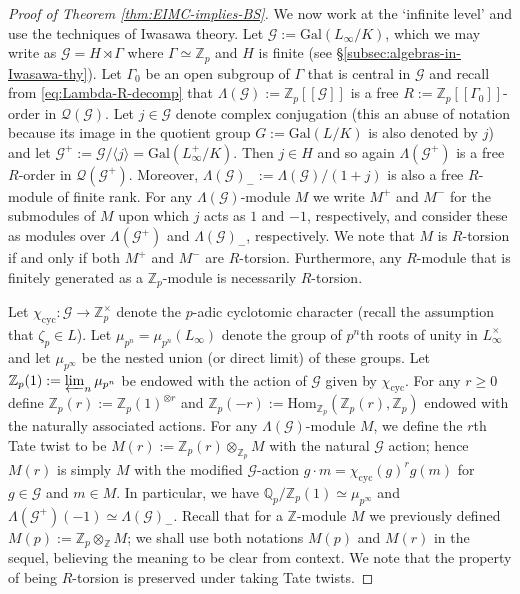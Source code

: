 \documentclass[12pt]{amsart}
\theoremstyle{plain}
\theoremstyle{remark}
\theoremstyle{definition}
\numberwithin{equation}{section}
\begin{document}
{\begin{proof}[Proof of Theorem \ref{thm:EIMC-implies-BS}]
We now work at the `infinite level' and use the techniques of Iwasawa theory.
Let $\mathcal{G} := {\mathrm{Gal}}(L_{\infty}/K)$, which we may write as $\mathcal{G} = H \rtimes \Gamma$ where $\Gamma \simeq {\mathbb{Z}}_{p}$ 
and $H$ is finite (see \S \ref{subsec:algebras-in-Iwasawa-thy}). 
Let $\Gamma_{0}$ be an open subgroup of $\Gamma$ that is central in $\mathcal{G}$ and recall from 
 \eqref{eq:Lambda-R-decomp} that $\Lambda(\mathcal{G}):={\mathbb{Z}}_{p}[[\mathcal{G}]]$ is a free
$R := {\mathbb{Z}}_{p}[[\Gamma_{0}]]$-order in $\mathcal{Q}(\mathcal{G})$.
Let $j \in \mathcal{G}$ denote complex conjugation (this an abuse of notation because its image in the quotient group
$G:={\mathrm{Gal}}(L/K)$ is also denoted by $j$) and let $\mathcal{G}^{+} := \mathcal{G} / \langle j \rangle = {\mathrm{Gal}}(L_{\infty}^{+}/K)$.
Then $j \in H$ and so again $\Lambda(\mathcal{G}^{+})$ is a free $R$-order in $\mathcal{Q}(\mathcal{G}^{+})$. 
Moreover, $\Lambda(\mathcal{G})_{-} := \Lambda(\mathcal{G}) / (1+j)$ is also a free $R$-module of finite rank.
For any $\Lambda(\mathcal{G})$-module $M$ we write $M^{+}$ and $M^{-}$ for the submodules of $M$ upon 
which $j$ acts as $1$ and $-1$, respectively, and consider these as modules over $\Lambda(\mathcal{G}^{+})$ and
$\Lambda(\mathcal{G})_{-}$, respectively. 
We note that $M$ is $R$-torsion if and only if both $M^{+}$ and $M^{-}$ are $R$-torsion.
Furthermore, any $R$-module that is finitely generated as a ${\mathbb{Z}}_{p}$-module is necessarily $R$-torsion.

Let $\chi_{\mathrm{cyc}}:\mathcal{G} \rightarrow {\mathbb{Z}}_{p}^{\times}$ denote the $p$-adic cyclotomic character (recall the assumption that $\zeta_{p} \in L$).
Let $\mu_{p^{n}}=\mu_{p^{n}}(L_{\infty})$ denote the group of $p^{n}$th roots of unity in $L_{\infty}^{\times}$
and let $\mu_{p^{\infty}}$ be the nested union (or direct limit) of these groups.
Let ${\mathbb{Z}}_{p}(1):= \varprojlim_{n} \mu_{p^{n}}$ be endowed with the action of $\mathcal{G}$ given by 
$\chi_{\mathrm{cyc}}$.
For any $r \geq 0$ define ${\mathbb{Z}}_{p}(r) := {\mathbb{Z}}_{p}(1)^{\otimes r}$ and ${\mathbb{Z}}_{p}(-r) := {\mathrm{Hom}}_{{\mathbb{Z}}_{p}}({\mathbb{Z}}_{p}(r),{\mathbb{Z}}_{p})$
endowed with the naturally associated actions. 
For any $\Lambda(\mathcal{G})$-module $M$, we define the $r$th Tate twist to be $M(r):= {\mathbb{Z}}_{p}(r) \otimes_{{\mathbb{Z}}_{p}} M$
with the natural $\mathcal{G}$ action; hence $M(r)$ is simply $M$ with the modified $\mathcal{G}$-action 
$g \cdot m = \chi_{\mathrm{cyc}}(g)^{r} g(m)$ for $g \in \mathcal{G}$ and $m \in M$.
In particular, we have ${\mathbb{Q}}_{p} / {\mathbb{Z}}_{p} (1) \simeq \mu_{p^{\infty}}$ and $\Lambda(\mathcal{G}^{+})(-1) \simeq \Lambda(\mathcal{G})_{-}$.
Recall that for a ${\mathbb{Z}}$-module $M$ we previously defined $M(p):={\mathbb{Z}}_{p} \otimes_{\mathbb{Z}} M$; 
we shall use both notations $M(p)$ and $M(r)$ in the sequel, believing the meaning to be clear from context. 
We note that the property of being $R$-torsion is preserved under taking Tate twists. 


\end{proof}}
\end{document}
